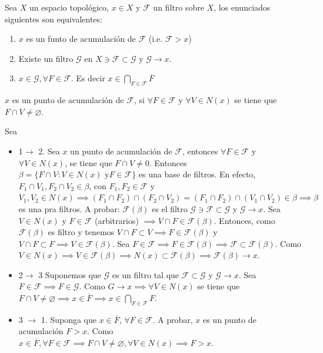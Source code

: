 \begin{teorema}
    Sea $X$ un espacio topológico, $x\in X$ y $\mathcal{F}$ un filtro sobre $X$, los enunciados siguientes son equivalentes: 
    \begin{enumerate}
        \item $x$ es un funto de acumulación de $\mathcal{F}$ (i.e. $\mathcal{F}>x$)
        \item Existe un filtro $\mathcal{G}$ en $X\ni \mathcal{F}\subset \mathcal{G}$ y $\mathcal{G}\to x$. 
        \item $x\in \mathcal{G},\forall F\in \mathcal{F}$. Es decir $x\in \bigcap_{F\in \mathcal{F}}\overline{F}$
    \end{enumerate}
    \begin{cajita}
        $x$ es un punto de acumulación de $\mathcal{F}$, si $\forall F\in \mathcal{F}$ y $\forall V\in N(x)$ se tiene que $F\cap V\neq \varnothing$.
    \end{cajita}
    \begin{dem}
        Sea 
        \begin{itemize}
            \item 1$\to$ 2. Sea $x$ un punto de acumulación de $\mathcal{F}$, entonces $\forall F\in\mathcal{F}$ y $\forall V\in N(x)$, se tiene que $F\cap V\neq 0$. Entonces $\beta = \{F\cap V: V\in N(x) \text{ y} F\in \mathcal{F}\}$ es una base de filtros. En efecto, $F_1\cap V_1, F_2\cap V_2\in \beta$, con $F_1,F_2\in \mathcal{F}$ y $V_1,V_2\in N(x)\implies (F_1\cap F_2)\cap (F_2\cap V_2)= (F_1\cap F_2)\cap (V_1\cap V_2)\in \beta \implies \beta$ es una pra filtros. A probar: $\mathcal{F}(\beta)$ es el filtro $\mathcal{G}\ni \mathcal{F}\subset\mathcal{G}$ y $\mathcal{G}\to x$. Sea $V\in N(x)$ y $F\in \mathcal{F}$ (arbitrarios) $\implies V\cap F\in \mathcal{F}(\beta)$. Entonces, como $\mathcal{F}(\beta)$ es filtro y tenemos $V\cap F\subset V\implies F\in \mathcal{F}(\beta)$ y $V\cap F\subset F\implies V\in \mathcal{F}(\beta)$. Sea $F\in \mathcal{F}\implies F\in \mathcal{F}(\beta)\implies \mathcal{F}\subset\mathcal{F}(\beta)$. Como $V\in N(x)\implies V\in \mathcal{F}(\beta)\implies N(x)\subset \mathcal{F}(\beta)\implies \mathcal{F}(\beta)\to x$.
            \item 2$\to$ 3 Suponemos que $\mathcal{G}$ es un filtro tal que $\mathcal{F}\subset \mathcal{G}$ y $\mathcal{G}\to x$. Sea $F\in \mathcal{F}\implies F\in \mathcal{G}$. Como $G\to x\implies \forall V\in N(x)$ se tiene que $F\cap V\neq \varnothing\implies x\in \overline{F}\implies x\in \bigcap_{F\in \mathcal{F}}F$.
            \item  3 $\to$ 1. Suponga que $x\in \overline{F}$, $\forall F\in \mathcal{F}$. A probar, $x$ es un punto de acumulación $F>x$. Como $x\in \overline{F},\forall F\in \mathcal{F}\implies F\cap V\neq \varnothing,\forall V\in N(x)\implies F>x$. 
        \end{itemize}
    \end{dem}
\end{teorema}


